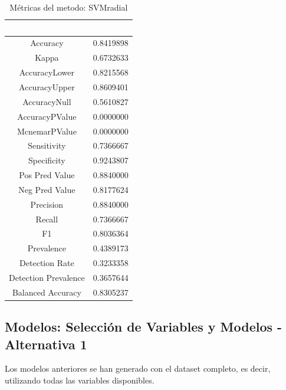 \begin{table}[!h]
	
	\caption{\label{tab:metricas_SVMradial}Métricas del metodo: SVMradial }
	\centering
	\begin{tabular}[t]{cc}
		\toprule
		\rowcolor{black}  \multicolumn{1}{c}{\textcolor{white}{\textbf{metricas}}} & \multicolumn{1}{c}{\textcolor{white}{\textbf{valor}}}\\
		\midrule
		\rowcolor{gray!6}  Accuracy & 0.8419898\\
		Kappa & 0.6732633\\
		\rowcolor{gray!6}  AccuracyLower & 0.8215568\\
		AccuracyUpper & 0.8609401\\
		\rowcolor{gray!6}  AccuracyNull & 0.5610827\\
		\addlinespace
		AccuracyPValue & 0.0000000\\
		\rowcolor{gray!6}  McnemarPValue & 0.0000000\\
		Sensitivity & 0.7366667\\
		\rowcolor{gray!6}  Specificity & 0.9243807\\
		Pos Pred Value & 0.8840000\\
		\addlinespace
		\rowcolor{gray!6}  Neg Pred Value & 0.8177624\\
		Precision & 0.8840000\\
		\rowcolor{gray!6}  Recall & 0.7366667\\
		F1 & 0.8036364\\
		\rowcolor{gray!6}  Prevalence & 0.4389173\\
		\addlinespace
		Detection Rate & 0.3233358\\
		\rowcolor{gray!6}  Detection Prevalence & 0.3657644\\
		Balanced Accuracy & 0.8305237\\
		\bottomrule
	\end{tabular}
\end{table}




\subsection{Modelos: Selección de Variables y Modelos - Alternativa 1}

Los modelos anteriores se han generado con el dataset completo, es decir, utilizando todas las variables disponibles.\\


